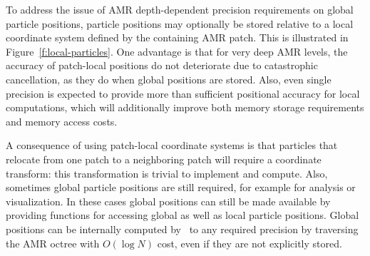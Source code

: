 \documentclass[10pt,twocolumn]{article}
\begin{document}
To address the issue of AMR depth-dependent precision requirements on
global particle positions, particle positions may optionally be stored
relative to a local coordinate system defined by the containing AMR
patch.  This is illustrated in Figure~\ref{f:local-particles}.  One
advantage is that for very deep AMR levels, the accuracy of
patch-local positions do not deteriorate due to catastrophic
cancellation, as they do when global positions are stored.  Also, even
single precision is expected to provide more than sufficient
positional accuracy for local computations, which will additionally
improve both memory storage requirements and memory access costs.



A consequence of using patch-local coordinate systems is that
particles that relocate from one patch to a neighboring patch will
require a coordinate transform: this transformation is trivial to
implement and compute.  Also, sometimes global particle positions are
still required, for example for analysis or visualization.  In these
cases global positions can still be made available by providing
functions for accessing global as well as local particle positions.
Global positions can be internally computed by \cello\ to any required
precision by traversing the AMR octree with $O(\log N)$ cost, even
if they are not explicitly stored.

\end{document}
